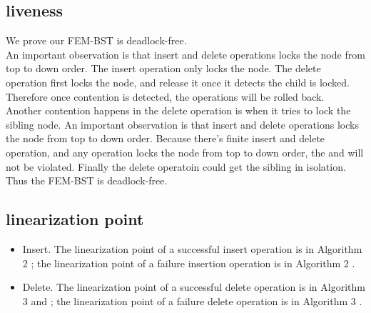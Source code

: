 \documentclass{article}
\begin{document}
\subsection{liveness}
We prove our FEM-BST is deadlock-free.\\
An important observation is that insert and delete operations locks the node from top to down order. The insert operation only locks the  node. The delete operation first locks the  node, and release it once it detects the child is locked. Therefore once contention is detected, the operations will be rolled back.\\
Another contention happens in the delete operation is when it tries to lock the sibling node.  An important observation is that insert and delete operations locks the node from top to down order. Because there's finite insert and delete operation, and any operation locks the node from top to down order, the  and  will not be violated. Finally the delete operatoin could get the sibling in isolation. Thus the FEM-BST is deadlock-free.
\subsection{linearization point}
\begin{itemize}
\item Insert. The linearization point of a successful insert operation is in Algorithm 2  ; the linearization point of a failure insertion operation is in Algorithm 2  .
\item Delete. The linearization point of a successful delete operation is in Algorithm 3   and  ; the linearization point of a failure delete operation is in Algorithm 3  .
\end{itemize}
\end{document}
